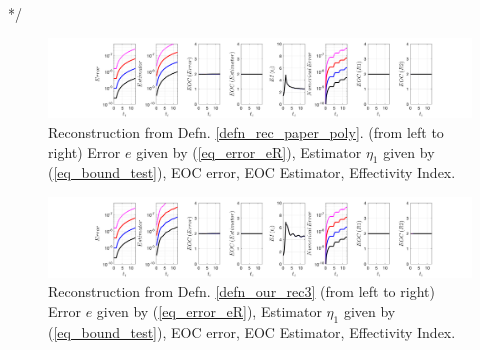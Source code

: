 \documentclass[12pt,a4paper]{article}
\numberwithin{equation}{section}
\theoremstyle{definition}
\begin{document}
*/
\begin{figure}[H]
	\hspace{-3cm}
	\includegraphics[scale=0.55]{fig_LeapFrogplots_1x5_sin_IC_harmonic_u8_v2_paperrec_poly_our_res}	
	\caption{Reconstruction from Defn. \ref{defn_rec_paper_poly}. (from left to right) Error $e$ given by (\ref{eq_error_eR}), Estimator $\eta_1$ given by (\ref{eq_bound_test}), EOC error, EOC Estimator, Effectivity Index.}
	\label{fig_all_in_one_paperrec_poly_u08_v02}
\end{figure}
\begin{figure}[H]
	\hspace{-3cm}
	\includegraphics[scale=0.55]{fig_LeapFrogplots_1x5_sin_IC_harmonic_u8_v2_paperrec_poly_tristan}	
	\caption{Reconstruction from Defn. \ref{defn_our_rec3} (from left to right) Error $e$ given by (\ref{eq_error_eR}), Estimator $\eta_1$ given by (\ref{eq_bound_test}), EOC error, EOC Estimator, Effectivity Index.}
	\label{fig_all_in_one_paperrec_poly_tristan_u8_v2}
\end{figure}
\end{document}
